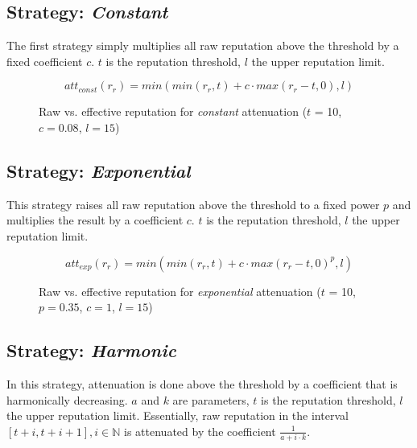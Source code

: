 \subsection{Strategy: \emph{Constant}}
The first strategy simply multiplies all raw reputation above the threshold by a
fixed coefficient $c$. $t$ is the reputation threshold, $l$ the upper reputation
limit.

\[att_{const}(r_r) = min(min(r_r, t) + c \cdot max(r_r - t, 0), l)\]

\begin{figure}[t]
\centering
{}
\caption{Raw vs. effective reputation for \emph{constant} attenuation ($t$ = 10,
$c = 0.08$, $l = 15$)}
\label{fig:att_const_raw_vs_eff}
\end{figure}

\subsection{Strategy: \emph{Exponential}}
This strategy raises all raw reputation above the threshold to a fixed power $p$
and multiplies the result by a coefficient $c$. $t$ is the reputation threshold,
$l$ the upper reputation limit.

\[att_{exp}(r_r) = min(min(r_r, t) + c \cdot max(r_r - t, 0)^p, l)\]

\begin{figure}[t]
\centering
{}
\caption{Raw vs. effective reputation for \emph{exponential} attenuation ($t$ =
10, $p = 0.35$, $c = 1$, $l = 15$)}
\label{fig:att_exp_raw_vs_eff}
\end{figure}

\subsection{Strategy: \emph{Harmonic}}
In this strategy, attenuation is done above the threshold by a coefficient that
is harmonically decreasing. $a$ and $k$ are parameters, $t$ is the reputation
threshold, $l$ the upper reputation limit.  Essentially, raw reputation in the
interval $[t + i, t + i + 1], i \in \mathbb{N}$ is attenuated by the coefficient
$\frac{1}{a + i \cdot k}$.

